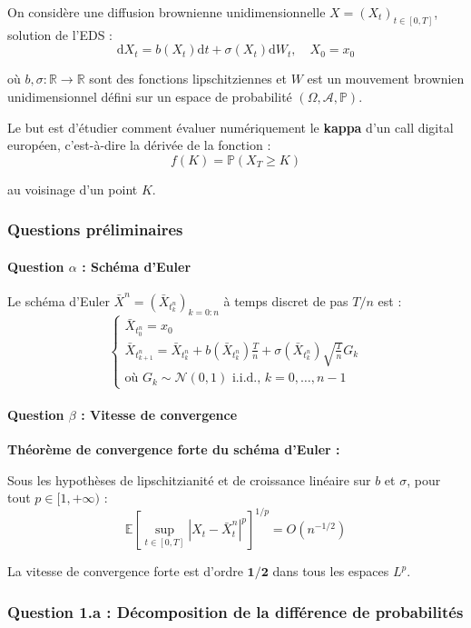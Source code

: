 \documentclass[12pt,a4paper]{article}
\theoremstyle{definition}
\theoremstyle{remark}
\newcommand{\R}{\mathbb{R}}
\newcommand{\E}{\mathbb{E}}
\newcommand{\Prob}{\mathbb{P}}
\newcommand{\dd}{\mathrm{d}}
\newcommand{\supt}[1]{\sup_{t \in #1}}
\begin{document}
On considère une diffusion brownienne unidimensionnelle $X = (X_t)_{t \in [0,T]}$, solution de l'EDS :
\[
\dd X_t = b(X_t)\dd t + \sigma(X_t)\dd W_t, \quad X_0 = x_0
\]

où $b, \sigma : \R \to \R$ sont des fonctions lipschitziennes et $W$ est un mouvement brownien unidimensionnel défini sur un espace de probabilité $(\Omega, \mathcal{A}, \Prob)$.

Le but est d'étudier comment évaluer numériquement le \textbf{kappa} d'un call digital européen, c'est-à-dire la dérivée de la fonction :
\[
f(K) = \Prob(X_T \geq K)
\]

au voisinage d'un point $K$.

\subsubsection{Questions préliminaires}

\paragraph{Question $\alpha$ : Schéma d'Euler}

Le schéma d'Euler $\bar{X}^n = (\bar{X}_{t_k^n})_{k=0:n}$ à temps discret de pas $T/n$ est :
\begin{equation}
\boxed{
\begin{cases}
\bar{X}_{t_0^n} = x_0 \\
\bar{X}_{t_{k+1}^n} = \bar{X}_{t_k^n} + b(\bar{X}_{t_k^n})\frac{T}{n} + \sigma(\bar{X}_{t_k^n})\sqrt{\frac{T}{n}}G_k \\
\text{où } G_k \sim \mathcal{N}(0,1) \text{ i.i.d., } k = 0, \ldots, n-1
\end{cases}
}
\end{equation}

\paragraph{Question $\beta$ : Vitesse de convergence}

\textbf{Théorème de convergence forte du schéma d'Euler :}

Sous les hypothèses de lipschitzianité et de croissance linéaire sur $b$ et $\sigma$, pour tout $p \in [1, +\infty)$ :
\[
\boxed{\E\left[\supt{[0,T]} |X_t - \bar{X}_t^n|^p\right]^{1/p} = O(n^{-1/2})}
\]

La vitesse de convergence forte est d'ordre $\mathbf{1/2}$ dans tous les espaces $L^p$.

\subsubsection{Question 1.a : Décomposition de la différence de probabilités}
\end{document}
